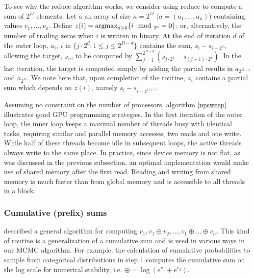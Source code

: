 To see why the reduce algorithm works, we consider using reduce to compute a sum of $2^D$ elements. Let $a$ an array of size $n=2^D$ ($a=(a_1,\ldots,a_n)$) containing values $v_1,\ldots,v_n$. Define $z(i)=\operatorname{argmax}_{d\ge 0}\{i \mod_{2^d} =0\}$; or, alternatively, the number of trailing zeros when $i$ is written in binary. At the end of iteration $d$ of the outer loop, $a_{i},\,i$ in $\{j\cdot 2^d: 1 \le j \le 2^{D-d}\}$ contains the sum, $s_{i}-s_{i-2^d}$, allowing the target, $s_n$, to be computed by $\sum_{j=1}^{2^{D-d}}(s_{j\cdot 2^d}-s_{(j-1)\cdot 2^d})$. In the last iteration, the target is computed simply by adding the partial results in $a_{2^{D-1}}$ and $a_{2^{D}}$. We note here that, upon completion of the routine, $a_i$ contains a partial sum which depends on $z(i)$, namely $s_i - s_{i-2^{z(i)}}$.

Assuming no constraint on the number of processors, algorithm \ref{upsweep} illustrates good GPU programming strategies. In the first iteration of the outer loop, the inner loop keeps a maximal number of threads busy with identical tasks, requiring similar and parallel memory accesses, two reads and one write. While half of these threads become idle in subsequent loops, the active threads always write to the same place. In practice, since device memory is not flat, as was discussed in the previous subsection, an optimal implementation would make use of shared memory after the first read. Reading and writing from shared memory is much faster than from global memory and is accessible to all threads in a block.




\subsubsection{Cumulative (prefix) sums}
\citet{blelloch1990} described a general algorithm for computing $v_1,
v_1 \oplus v_2, \ldots, v_1 \oplus \ldots \oplus v_n$. This kind of routine is a generalization of a cumulative sum and is used in various ways in our MCMC algorithm. For example, the calculation of cumulative probabilities to sample from categorical distributions in step 1 computes the cumulative sum on the log scale for numerical stability, i.e. $\oplus=\log(e^{v_1}+e^{v_2})$.

